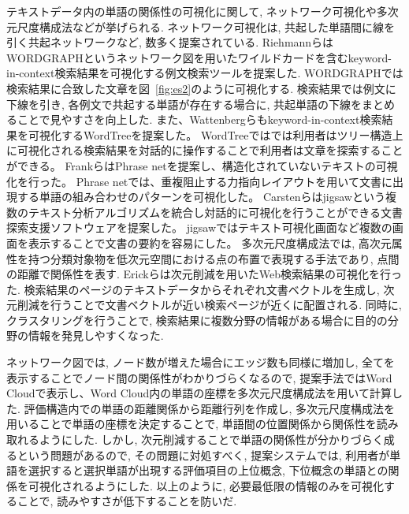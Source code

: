 \documentclass[syuuron]{kuee}
\begin{document}
		テキストデータ内の単語の関係性の可視化に関して, ネットワーク可視化や多次元尺度構成法などが挙げられる. 
		ネットワーク可視化は, 共起した単語間に線を引く共起ネットワークなど, 数多く提案されている. 
		RiehmannらはWORDGRAPHというネットワーク図を用いたワイルドカードを含むkeyword-in-context検索結果を可視化する例文検索ツールを提案した\cite{wg1}. 
		WORDGRAPHでは検索結果に合致した文章を図~\ref{fig:es2}のように可視化する. 
		検索結果では例文に下線を引き, 各例文で共起する単語が存在する場合に, 共起単語の下線をまとめることで見やすさを向上した. 
		また、Wattenbergらもkeyword-in-context検索結果を可視化するWordTreeを提案した。
		WordTreeではでは利用者はツリー構造上に可視化される検索結果を対話的に操作することで利用者は文章を探索することができる。
		FrankらはPhrase netを提案し、構造化されていないテキストの可視化を行った。
		Phrase netでは、重複阻止する力指向レイアウトを用いて文書に出現する単語の組み合わせのパターンを可視化した。
		Carstenらはjigsawという複数のテキスト分析アルゴリズムを統合し対話的に可視化を行うことができる文書探索支援ソフトウェアを提案した。
		jigsawではテキスト可視化画面など複数の画面を表示することで文書の要約を容易にした。
		多次元尺度構成法では, 高次元属性を持つ分類対象物を低次元空間における点の布置で表現する手法であり, 点間の距離で関係性を表す. 
		Erickらは次元削減を用いたWeb検索結果の可視化を行った\cite{or1}. 
		検索結果のページのテキストデータからそれぞれ文書ベクトルを生成し, 次元削減を行うことで文書ベクトルが近い検索ページが近くに配置される. 
		同時に, クラスタリングを行うことで, 検索結果に複数分野の情報がある場合に目的の分野の情報を発見しやすくなった. 
		
		ネットワーク図では, ノード数が増えた場合にエッジ数も同様に増加し, 全てを表示することでノード間の関係性がわかりづらくなるので, 
		提案手法ではWord Cloudで表示し、Word Cloud内の単語の座標を多次元尺度構成法を用いて計算した. 
		評価構造内での単語の距離関係から距離行列を作成し, 多次元尺度構成法を用いることで単語の座標を決定することで, 
		単語間の位置関係から関係性を読み取れるようにした. 
		しかし, 次元削減することで単語の関係性が分かりづらく成るという問題があるので, その問題に対処すべく, 
		提案システムでは, 利用者が単語を選択すると選択単語が出現する評価項目の上位概念, 下位概念の単語との関係を可視化されるようにした. 
		以上のように, 必要最低限の情報のみを可視化することで, 読みやすさが低下することを防いだ. 
		
\end{document}
